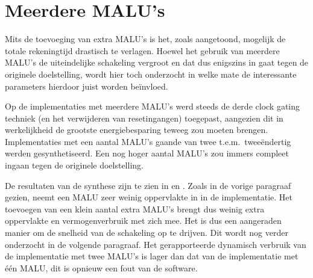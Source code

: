 \section{Meerdere MALU's\label{sectie-resulaten-MALU's}}

Mits de toevoeging van extra MALU's is het, zoals aangetoond, mogelijk de totale rekeningtijd drastisch te verlagen. Hoewel het gebruik van meerdere MALU's de uiteindelijke schakeling vergroot en dat dus enigszins in gaat tegen de originele doelstelling, wordt hier toch onderzocht in welke mate de interessante parameters hierdoor juist worden be\"invloed.

Op de implementaties met meerdere MALU's werd steeds de derde clock gating techniek (en het verwijderen van resetingangen) toegepast, aangezien dit in werkelijkheid de grootste energiebesparing teweeg zou moeten brengen. Implementaties met een aantal MALU's gaande van twee t.e.m.\ twee\"endertig werden gesynthetiseerd. Een nog hoger aantal MALU's zou immers compleet ingaan tegen de originele doelstelling.

De resultaten van de synthese zijn te zien in  en . Zoals in de vorige paragraaf gezien, neemt een MALU zeer weinig oppervlakte in in de implementatie. Het toevoegen van een klein aantal extra MALU's brengt dus weinig extra oppervlakte en vermogenverbruik met zich mee. Het is dus een aangeraden manier om de snelheid van de schakeling op te drijven. Dit wordt nog verder onderzocht in de volgende paragraaf. Het gerapporteerde dynamisch verbruik van de implementatie met twee MALU's is lager dan dat van de implementatie met \'e\'en MALU, dit is opnieuw een fout van de software.

